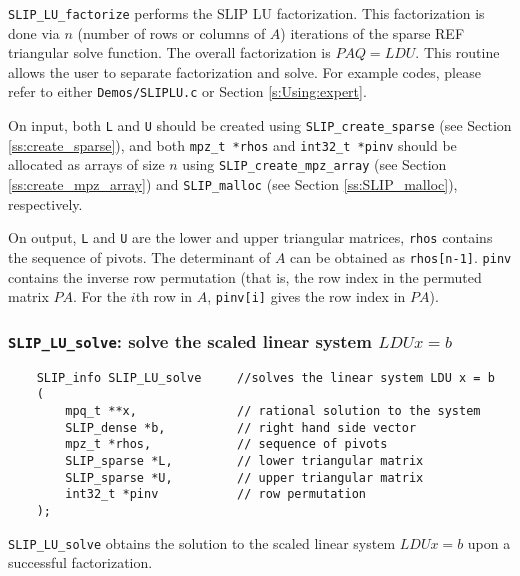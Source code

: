 \documentclass[12pt]{article}
\theoremstyle{definition}
\begin{document}
\verb|SLIP_LU_factorize| performs the SLIP LU factorization. This factorization
is done via $n$ (number of rows or columns of $A$) iterations of the sparse
REF triangular solve function. The overall factorization is $PAQ = LDU$.  This
routine allows the user to separate factorization and solve. For example codes,
please refer to either \verb|Demos/SLIPLU.c| or Section \ref{s:Using:expert}.

On input, both \verb|L| and \verb|U| should be created using
\verb|SLIP_create_sparse| (see Section \ref{ss:create_sparse}), and both
\verb|mpz_t *rhos| and \verb|int32_t *pinv| should be allocated as arrays of
size $n$ using \verb|SLIP_create_mpz_array| (see Section
\ref{ss:create_mpz_array}) and \verb|SLIP_malloc| (see Section
\ref{ss:SLIP_malloc}), respectively.

On output, \verb|L| and \verb|U| are the lower and upper triangular matrices,
\verb|rhos| contains the sequence of pivots. The determinant of $A$ can be
obtained as \verb|rhos[n-1]|. \verb|pinv| contains the inverse row permutation
(that is, the row index in the permuted matrix $PA$. For the $i$th row in $A$,
\verb|pinv[i]| gives the row index in $PA$).

\cprotect\subsubsection{\verb|SLIP_LU_solve|: solve the scaled linear system $LDUx=b$}
\label{ss:SLIP_LU_solve}

\begin{mdframed}[userdefinedwidth=6in]
{\footnotesize
\begin{verbatim}
    SLIP_info SLIP_LU_solve     //solves the linear system LDU x = b
    (
        mpq_t **x,              // rational solution to the system
        SLIP_dense *b,          // right hand side vector
        mpz_t *rhos,            // sequence of pivots
        SLIP_sparse *L,         // lower triangular matrix
        SLIP_sparse *U,         // upper triangular matrix
        int32_t *pinv           // row permutation
    );
\end{verbatim}
} \end{mdframed}


\verb|SLIP_LU_solve| obtains the solution to the scaled linear system $LDUx=b$
upon a successful factorization.
\end{document}

